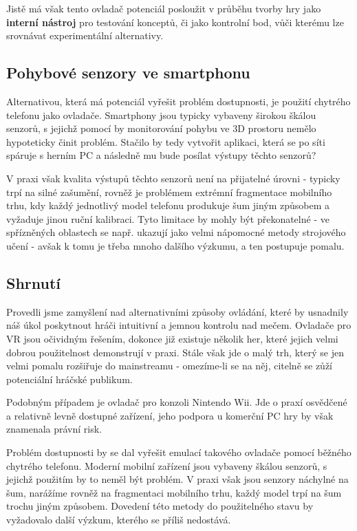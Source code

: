 Jistě má však tento ovladač potenciál posloužit v průběhu tvorby hry jako \textbf{interní nástroj} pro testování konceptů, či jako kontrolní bod, vůči kterému lze srovnávat experimentální alternativy.

\subsection{Pohybové senzory ve smartphonu}

Alternativou, která má potenciál vyřešit problém dostupnosti, je použití chytrého telefonu jako ovladače. Smartphony jsou typicky vybaveny širokou škálou senzorů, s jejichž pomocí by monitorování pohybu ve 3D prostoru nemělo hypoteticky činit problém. Stačilo by tedy vytvořit aplikaci, která se po síti spáruje s herním PC a následně mu bude posílat výstupy těchto senzorů?

V praxi však kvalita výstupů těchto senzorů není na přijatelné úrovni \cite{SmartphoneSensorsEvaluation} - typicky trpí na silné zašumění, rovněž je problémem extrémní fragmentace mobilního trhu, kdy každý jednotlivý model telefonu produkuje šum jiným způsobem a vyžaduje jinou ruční kalibraci. Tyto limitace by mohly být překonatelné - ve spřízněných oblastech se např. ukazují jako velmi nápomocné metody strojového učení \cite{AccelerometerStepDetectionUsingML} - avšak k tomu je třeba mnoho dalšího výzkumu, a ten postupuje pomalu.

\subsection{Shrnutí}
Provedli jsme zamyšlení nad alternativními způsoby ovládání, které by usnadnily náš úkol poskytnout hráči intuitivní a jemnou kontrolu nad mečem. Ovladače pro \acs{VR} jsou očividným řešením, dokonce již existuje několik her, které jejich velmi dobrou použitelnost demonstrují v praxi. Stále však jde o malý trh, který se jen velmi pomalu rozšiřuje do mainstreamu - omezíme-li se na něj, citelně se zůží potenciální hráčské publikum.

Podobným případem je ovladač pro konzoli Nintendo Wii. Jde o praxí osvědčené a relativně levně dostupné zařízení, jeho podpora u komerční PC hry by však znamenala právní risk.

Problém dostupnosti by se dal vyřešit emulací takového ovladače pomocí běžného chytrého telefonu. Moderní mobilní zařízení jsou vybaveny škálou senzorů, s jejichž použitím by to neměl být problém. V praxi však jsou senzory náchylné na šum, narážíme rovněž na fragmentaci mobilního trhu, každý model trpí na šum trochu jiným způsobem. Dovedení této metody do použitelného stavu by vyžadovalo další výzkum, kterého se příliš nedostává.

